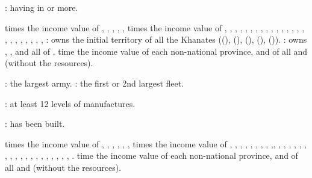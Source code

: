 \aparag[Diplomacy.]
 \VPs: having  in \AM or more.

\aparag[Territory.]
 times the income value of ,
, , ,
, 
 times the income value of ,
, , ,
, , ,
, ,
, , ,
, , ,
, , ,
, , ,
, , ,
 \VPs: \paysmajeurRussie owns the initial territory of all
the Khanates (\paysSteppes (), \paysKazan
(), \paysCosaquesdon (),
\paysAstrakhan (), \paysCrimee
()).
 \VPs: \paysmajeurRussie owns \provinceNeva,
\provinceLietuva, \provinceEstland and all of \regionFinlande.
 time the income value of each non-national province, and of
all \COL and \TP (without the resources).

\aparag[Military.]
 \VPs: the largest army.
 \VPs: the first or 2nd largest fleet.

\aparag[Industry.]
 \VPs: at least 12 levels of manufactures.

\aparag[Development.]
 \VPs:  has been built.

\aparag[Territory.]
 times the income value of ,
, , ,
, ,
 times the income value of ,
, , ,
, , ,
, ,,
, , ,
, ,
,  ,
, , ,
, , ,
, , ,
, , 
, .
 time the income value of each non-national province, and of
all \COL and \TP (without the resources).

